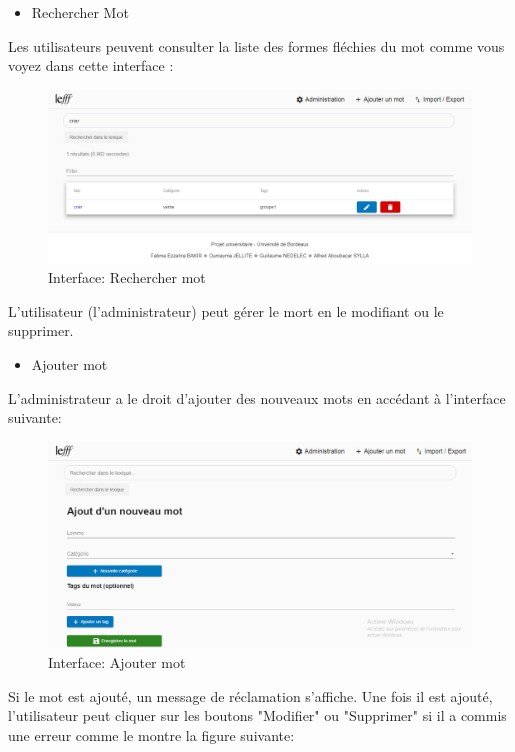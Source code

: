 \documentclass[12pt,a4paper]{article}
\begin{document}
\begin{itemize}  
  \item Rechercher Mot
\end{itemize}
Les utilisateurs peuvent consulter la liste des formes fléchies du mot comme vous voyez dans cette interface :


\begin{figure}[h]
\centering
\includegraphics[width=150mm]{img/Recherche.PNG}
\caption{Interface: Rechercher mot}
\label{Tux}
\end{figure}




L’utilisateur (l’administrateur) peut gérer le mort en le modifiant ou le supprimer.


\begin{itemize}  
  \item Ajouter mot
\end{itemize}

L'administrateur a le droit d'ajouter des nouveaux mots  en accédant à l'interface suivante: 


\begin{figure}[h]
\centering
\includegraphics[width=150mm]{img/Ajoutermot.PNG}
\caption{Interface: Ajouter mot}
\label{Tux}
\end{figure}


Si le mot  est ajouté, un message de réclamation s'affiche. Une fois il est ajouté, l'utilisateur peut cliquer sur les boutons "Modifier" ou "Supprimer" si il a commis une erreur comme le montre la figure suivante:
\end{document}
